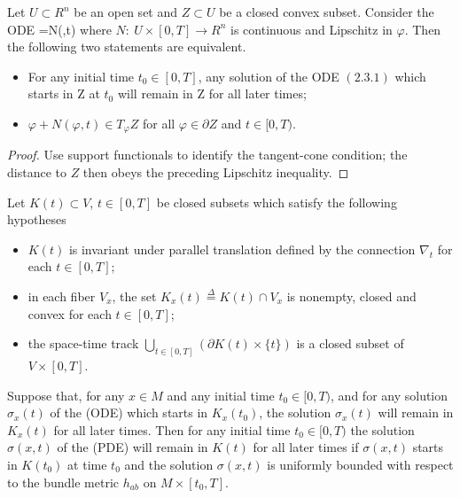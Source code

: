 \begin{lemma}
  \label{lem:cz-invariance-criterion-for-closed-convex-sets}
Let $U\subset R^n$ be an open set and $Z\subset U$ be a closed
convex subset. Consider the {\rm ODE} \be
{}=N(\varphi,t)%
\ee where $N:\ U\times[0,T]\rightarrow R^n$ is continuous and
Lipschitz in $\varphi$. Then the following two statements are
equivalent.
\begin{itemize}
\item[(i)] For any initial time $t_0\in[0,T]$, any solution of the
{\rm ODE} $(2.3.1)$ which starts in Z at $t_0$ will remain in Z
for all later times; \item[(ii)] $\varphi+N(\varphi,t)\in
T_\varphi Z$ for all $\varphi\in\partial Z$ and $t\in[0,T)$.
\end{itemize}
\end{lemma}

\begin{proof}
  \sketch Use support functionals to identify the tangent-cone condition; the distance to $Z$ then obeys the preceding Lipschitz inequality.
\end{proof}

\begin{theorem}
  \label{thm:cz-maximum-principle-for-closed-fiberwise-convex-sets}
Let $K(t)\subset V$, $t\in [0,T]$ be closed subsets which satisfy
the following hypotheses
\begin{itemize}
\item[(H3)] $K(t)$ is invariant under parallel translation defined
by the connection $\nabla_t$ for each $t\in [0,T]$; \item[(H4)] in
each fiber $V_x$, the set $K_x(t)\stackrel{\Delta}{=}K(t)\cap V_x$
is nonempty, closed and convex for each $t\in [0,T]$; \item[(H5)]
the space-time track $\bigcup\limits_{t\in[0,T]}(\partial
K(t)\times\{t\})$ is a closed subset of $V\times[0,T]$.
\end{itemize}
Suppose that, for any $x\in M$ and any initial time $t_0\in[0,T)$,
and for any solution $\sigma_x(t)$ of the {\rm (ODE)} which starts
in $K_x(t_0)$, the solution $\sigma_x(t)$ will remain in $K_x(t)$
for all later times. Then for any initial time $t_0\in[0,T)$ the
solution $\sigma(x,t)$ of the {\rm (PDE)} will remain in $K(t)$
for all later times if $\sigma(x,t)$ starts in $K(t_0)$ at time
$t_0$ and the solution $\sigma(x,t)$ is uniformly bounded with
respect to the bundle metric $h_{ab}$ on $M\times[t_0,T]$.
\end{theorem}


